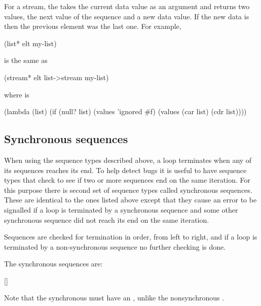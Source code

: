 For a stream, the  takes the current data value as an argument
 and returns two values, the next value of the sequence and a new data value.
If the new data is  then the previous element was the last
 one.  For example,
\begin{example}
  (list* elt my-list)
\end{example}
 is the same as
\begin{example}
  (stream* elt list->stream my-list)
\end{example}
 where  is
\begin{example}
  (lambda (list)
    (if (null? list)
        (values 'ignored \#f)
        (values (car list) (cdr list))))
\end{example}

\subsection{Synchronous sequences}

When using the sequence types described above, a loop terminates when any of
its sequences reaches its end.  To help detect bugs it is useful to have
sequence types that check to see if two or more sequences end on the same
iteration.  For this purpose there is second set of sequence types called
synchronous sequences.  These are identical to the ones listed above except
that they cause an error to be signalled if a loop is terminated by a
synchronous sequence and some other synchronous sequence did not reach its
end on the same iteration.

Sequences are checked for termination in order, from left to right, and
if a loop is terminated by a non-synchronous sequence no further checking
is done.

The synchronous sequences are:

\begin{protos}
 {    []}
 {   }
 {   }
\end{protos}

Note that the synchronous  must have an , unlike the
 nonsynchronous .

